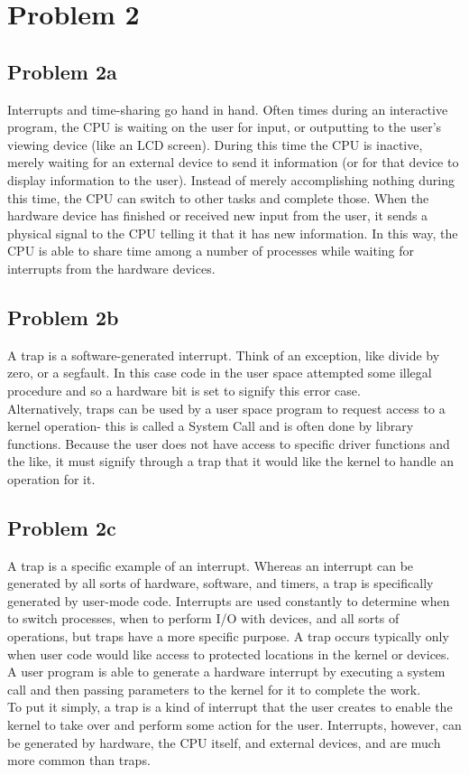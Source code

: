\documentclass[12pt]{article}
\begin{document}
\section*{Problem 2}
	\subsection*{Problem 2a}
Interrupts and time-sharing go hand in hand. Often times during an interactive program, the CPU is waiting on the user for input, or outputting to the user's viewing device (like an LCD screen). During this time the CPU is inactive, merely waiting for an external device to send it information (or for that device to display information to the user). Instead of merely accomplishing nothing during this time, the CPU can switch to other tasks and complete those. When the hardware device has finished or received new input from the user, it sends a physical signal to the CPU telling it that it has new information. In this way, the CPU is able to share time among a number of processes while waiting for interrupts from the hardware devices.

	\subsection*{Problem 2b}
A trap is a software-generated interrupt. Think of an exception, like divide by zero, or a segfault. In this case code in the user space attempted some illegal procedure and so a hardware bit is set to signify this error case.\\
Alternatively, traps can be used by a user space program to request access to a kernel operation- this is called a System Call and is often done by library functions. Because the user does not have access to specific driver functions and the like, it must signify through a trap that it would like the kernel to handle an operation for it.

	\subsection*{Problem 2c}
A trap is a specific example of an interrupt. Whereas an interrupt can be generated by all sorts of hardware, software, and timers, a trap is specifically generated by user-mode code. Interrupts are used constantly to determine when to switch processes, when to perform I/O with devices, and all sorts of operations, but traps have a more specific purpose. A trap occurs typically only when user code would like access to protected locations in the kernel or devices. A user program is able to generate a hardware interrupt by executing a system call and then passing parameters to the kernel for it to complete the work.\\
To put it simply, a trap is a kind of interrupt that the user creates to enable the kernel to take over and perform some action for the user. Interrupts, however, can be generated by hardware, the CPU itself, and external devices, and are much more common than traps.
\end{document}
